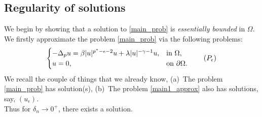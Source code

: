 \documentclass[12pt]{extarticle}
\theoremstyle{definition}
\theoremstyle{remark}
\theoremstyle{definition}
\numberwithin{equation}{section}
\numberwithin{equation}{section}
\begin{document}
		\subsection{Regularity of solutions}
		We begin by showing that a solution to \eqref{main_prob} is {\it essentially bounded} in $\Omega$. We firstly approximate the problem \eqref{main_prob} via the following problems:
		\[
		\begin{cases}\label{main1_approx}
			-\Delta_{p} u = \beta |u|^{p^*-\epsilon-2}u + \lambda |u|^{-\gamma-1}u, & \text{in } \Omega, \\
			u = 0, & \text{on } \partial \Omega.
		\end{cases}
		\tag{$P_{\epsilon}$}
		\]
		We recall the couple of things that we already know, (a)~The problem \eqref{main_prob} has solution(s), (b)~The problem \eqref{main1_approx} also has solutions, say, $(u_{\epsilon})$.\\
		Thus for $\delta_n\to 0^+$, there exists a solution.
		
\end{document}
